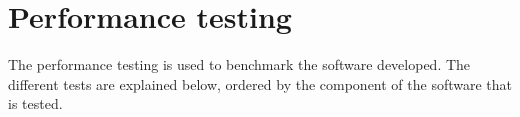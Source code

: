 









\section{Performance testing}
The performance testing is used to benchmark the software developed. The different tests are explained below, ordered by the component of the software that is tested. 


